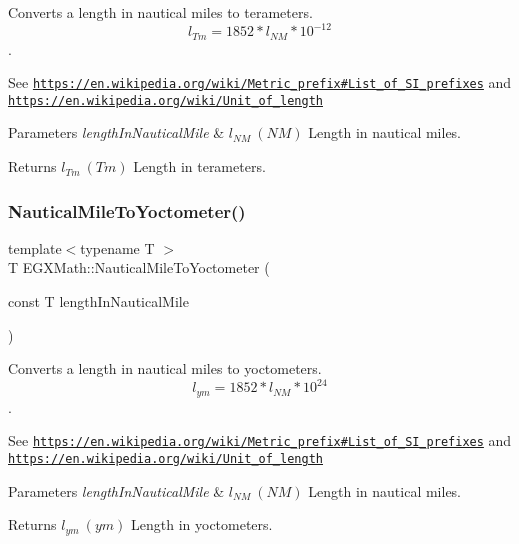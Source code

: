 Converts a length in nautical miles to terameters. \[ l_{Tm}=1852 * l_{NM} * 10^{-12} \]. 

See \href{https://en.wikipedia.org/wiki/Metric_prefix#List_of_SI_prefixes}{\tt https\+://en.\+wikipedia.\+org/wiki/\+Metric\+\_\+prefix\#\+List\+\_\+of\+\_\+\+S\+I\+\_\+prefixes} and \href{https://en.wikipedia.org/wiki/Unit_of_length}{\tt https\+://en.\+wikipedia.\+org/wiki/\+Unit\+\_\+of\+\_\+length} 
\begin{DoxyParams}{Parameters}
{\em length\+In\+Nautical\+Mile} & $ l_{NM}\ (NM)$ Length in nautical miles. \\
\hline
\end{DoxyParams}
\begin{DoxyReturn}{Returns}
$ l_{Tm}\ (Tm)$ Length in terameters. 
\end{DoxyReturn}
\mbox{\label{group___e_g_x_math-_conversions-_length_conversions-_non-_s_i-_nautical_mile-_s_i_ga88c9ac99418bf78c790532bd414d0a89}} 
\subsubsection{\texorpdfstring{Nautical\+Mile\+To\+Yoctometer()}{NauticalMileToYoctometer()}}
{\footnotesize\ttfamily template$<$typename T $>$ \\
T E\+G\+X\+Math\+::\+Nautical\+Mile\+To\+Yoctometer (\begin{DoxyParamCaption}\item[{const T}]{length\+In\+Nautical\+Mile }\end{DoxyParamCaption})}



Converts a length in nautical miles to yoctometers. \[ l_{ym}=1852 * l_{NM} * 10^{24} \]. 

See \href{https://en.wikipedia.org/wiki/Metric_prefix#List_of_SI_prefixes}{\tt https\+://en.\+wikipedia.\+org/wiki/\+Metric\+\_\+prefix\#\+List\+\_\+of\+\_\+\+S\+I\+\_\+prefixes} and \href{https://en.wikipedia.org/wiki/Unit_of_length}{\tt https\+://en.\+wikipedia.\+org/wiki/\+Unit\+\_\+of\+\_\+length} 
\begin{DoxyParams}{Parameters}
{\em length\+In\+Nautical\+Mile} & $ l_{NM}\ (NM)$ Length in nautical miles. \\
\hline
\end{DoxyParams}
\begin{DoxyReturn}{Returns}
$ l_{ym}\ (ym)$ Length in yoctometers. 
\end{DoxyReturn}
\mbox{\label{group___e_g_x_math-_conversions-_length_conversions-_non-_s_i-_nautical_mile-_s_i_gaae1116911eff729d693728d7757ac6eb}} 
